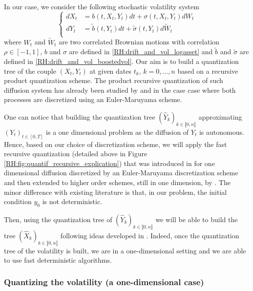 In our case, we consider the following stochastic volatility system
\begin{equation} \label{RH:systemvolsto}
	\left\{
	\begin{aligned}
		d X_t & = b (t, X_t, Y_t) dt + \sigma (t, X_t, Y_t) d W_t                        \\
		d Y_t & = \widetilde b (t, Y_t) dt + \widetilde \sigma (t, Y_t) d \widetilde W_t \\
	\end{aligned}
	\right.
\end{equation}
where $W_t$ and $\widetilde W_t$ are two correlated Brownian motions with correlation $\rho \in [-1, 1]$, $b$ and $\sigma$ are defined in \eqref{RH:drift_and_vol_logasset} and $\widetilde b$ and $\widetilde \sigma$ are defined in \eqref{RH:drift_and_vol_boostedvol}. Our aim is to build a quantization tree of the couple $(X_t, Y_t)$ at given dates $t_k, \, k=0, \dots, n$ based on a recursive product quantization scheme. The product recursive quantization of such diffusion system has already been studied by \cite{callegaro2017pricing} and \cite{rudd2017fast} in the case case where both processes are discretized using an Euler-Maruyama scheme.

One can notice that building the quantization tree $(\widehat{Y}_k)_{k \in \llbracket 0, n \rrbracket}$ approximating $( Y_t )_{t \in [0, T]}$ is a one dimensional problem as the diffusion of $Y_t$ is autonomous. Hence, based on our choice of discretization scheme, we will apply the fast recursive quantization (detailed above in Figure \ref{RH:fig:quantif_recursive_explication}) that was introduced in \cite{pages2015recursive} for one dimensional diffusion discretized by an Euler-Maruyama discretization scheme and then extended to higher order schemes, still in one dimension, by \cite{mcwalter2018recursive}. The minor difference with existing literature is that, in our problem, the initial condition $y_0$ is not deterministic.


Then, using the quantization tree of $(\widehat Y_k)_{k \in \llbracket 0, n \rrbracket}$ we will be able to build the tree $(\widehat{X}_k)_{k \in \llbracket 0, n \rrbracket}$ following ideas developed in \cite{abbas2018product,rudd2017fast,callegaro2017american,callegaro2017pricing}. Indeed, once the quantization tree of the volatility is built, we are in a one-dimensional setting and we are able to use fast deterministic algorithms.




\subsubsection{Quantizing the volatility (a one-dimensional case)}

